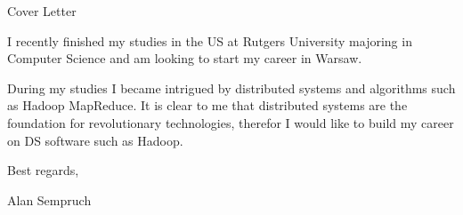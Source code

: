 \documentclass[letterpaper]{article}
\begin{document}
{\huge Cover Letter}
\vspace{0.25in}

I recently finished my studies in the US at Rutgers University majoring in Computer Science and am looking to start my career in Warsaw. 

During my studies I became intrigued by distributed systems and algorithms such as Hadoop MapReduce. It is clear to me that distributed systems are the foundation for revolutionary technologies, therefor I would like to build my career on DS software such as Hadoop.

\bigskip
Best regards,

Alan Sempruch

    
\end{document}

